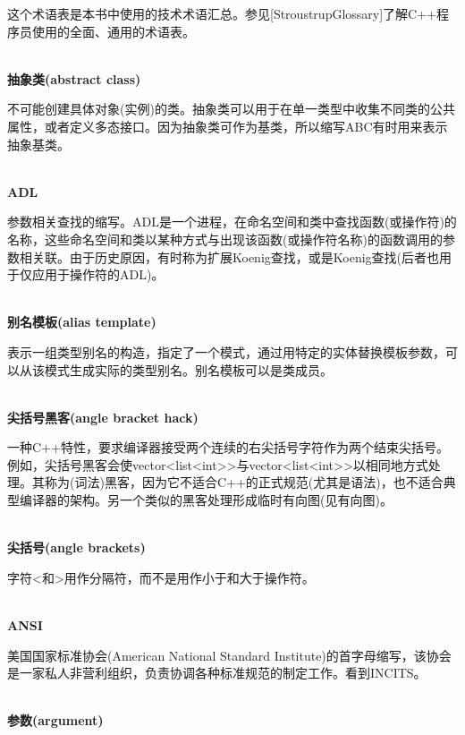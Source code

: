 
这个术语表是本书中使用的技术术语汇总。参见[StroustrupGlossary]了解C++程序员使用的全面、通用的术语表。

\hspace*{\fill} \\ %
\noindent
\textbf{抽象类(abstract class)}

不可能创建具体对象(实例)的类。抽象类可以用于在单一类型中收集不同类的公共属性，或者定义多态接口。因为抽象类可作为基类，所以缩写ABC有时用来表示抽象基类。

\hspace*{\fill} \\ %
\noindent
\textbf{ADL}

参数相关查找的缩写。ADL是一个进程，在命名空间和类中查找函数(或操作符)的名称，这些命名空间和类以某种方式与出现该函数(或操作符名称)的函数调用的参数相关联。由于历史原因，有时称为扩展Koenig查找，或是Koenig查找(后者也用于仅应用于操作符的ADL)。

\hspace*{\fill} \\ %
\noindent
\textbf{别名模板(alias template)}  

表示一组类型别名的构造，指定了一个模式，通过用特定的实体替换模板参数，可以从该模式生成实际的类型别名。别名模板可以是类成员。

\hspace*{\fill} \\ %
\noindent
\textbf{尖括号黑客(angle bracket hack)}

一种C++特性，要求编译器接受两个连续的右尖括号字符作为两个结束尖括号。例如，尖括号黑客会使vector<list<int>{}>与vector<list<int>{}>以相同地方式处理。其称为(词法)黑客，因为它不适合C++的正式规范(尤其是语法)，也不适合典型编译器的架构。另一个类似的黑客处理形成临时有向图(见有向图)。

\hspace*{\fill} \\ %
\noindent
\textbf{尖括号(angle brackets)}

字符<和>用作分隔符，而不是用作小于和大于操作符。

\hspace*{\fill} \\ %
\noindent
\textbf{ANSI}

美国国家标准协会(American National Standard Institute)的首字母缩写，该协会是一家私人非营利组织，负责协调各种标准规范的制定工作。看到INCITS。

\hspace*{\fill} \\ %
\noindent
\textbf{参数(argument)}

